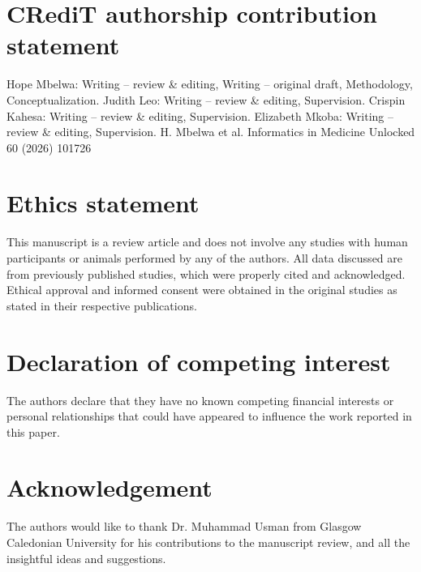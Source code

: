 \documentclass{svjour3}
\begin{document}
\section{CRediT authorship contribution statement}
Hope Mbelwa: Writing – review \& editing, Writing – original draft, Methodology, Conceptualization. Judith Leo: Writing – review \& editing, Supervision. Crispin Kahesa: Writing – review \& editing, Supervision. Elizabeth Mkoba: Writing – review \& editing, Supervision.
H. Mbelwa et al.
Informatics in Medicine Unlocked 60 (2026) 101726
\section{Ethics statement}
This manuscript is a review article and does not involve any studies with human participants or animals performed by any of the authors. All data discussed are from previously published studies, which were properly cited and acknowledged. Ethical approval and informed consent were obtained in the original studies as stated in their respective publications.
\section{Declaration of competing interest}
The authors declare that they have no known competing financial interests or personal relationships that could have appeared to influence the work reported in this paper.
\section{Acknowledgement}
The authors would like to thank Dr. Muhammad Usman from Glasgow Caledonian University for his contributions to the manuscript review, and all the insightful ideas and suggestions.

\end{document}
